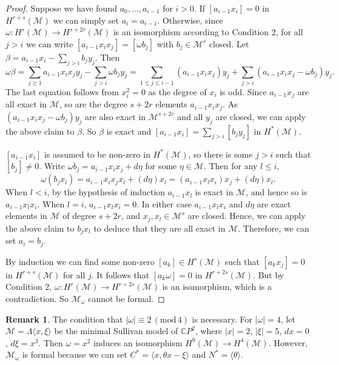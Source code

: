 \documentclass{article}
\theoremstyle{plain}
\theoremstyle{definition}
\newtheorem{rmk}[thm]{Remark}
\theoremstyle{plain}
\numberwithin{equation}{section}
\begin{document}
\begin{proof}
Suppose we have found $a_0,\ldots,a_{i-1}$ for $i>0$. If $[a_{i-1}x_i]=0$ in $H^{r+s}(\mathcal{M})$ we can simply set $a_i=a_{i-1}$. Otherwise, since $\omega:H^s(\mathcal{M})\to H^{s+2r}(\mathcal{M})$ is an isomorphism according to Condition 2, for all $j>i$ we can write $[a_{i-1}x_ix_j]=[\omega b_j]$ with $b_j\in\mathcal{M}^s$ closed. Let $\beta=a_{i-1}x_i-\sum_{j>i}b_j y_j$. Then
$$
\omega\beta = \sum_{j\geq 1} a_{i-1}x_ix_jy_j-\sum_{j>i}\omega b_j y_j = \sum_{1\leq j\leq i-1} (a_{i-1}x_ix_j)y_j+\sum_{j>i} (a_{i-1}x_ix_j-\omega b_j)y_j.
$$
The last equation follows from $x_i^2=0$ as the degree of $x_i$ is odd. Since $a_{i-1}x_j$ are all exact in $\mathcal{M}$, so are the degree $s+2r$ elements $a_{i-1}x_ix_j$. As $(a_{i-1}x_ix_j-\omega b_j)y_j$ are also exact in $\mathcal{M}^{s+2r}$ and all $y_j$ are closed, we can apply the above claim to $\beta$. So $\beta$ is exact and $[a_{i-1}x_i]=\sum_{j>i}[b_j y_j]$ in $H^*(\mathcal{M})$.

$[a_{i-1}x_i]$ is assumed to be non-zero in $H^*(\mathcal{M})$, so there is some $j>i$ such that $[b_j]\neq 0$. Write $\omega b_j=a_{i-1}x_ix_j+d\eta$ for some $\eta\in\mathcal{M}$. Then for any $l\leq i$,
$$
\omega(b_jx_l) = a_{i-1}x_ix_jx_l+(d\eta)x_l=(a_{i-1}x_lx_i)x_j+(d\eta)x_l.
$$
When $l<i$, by the hypothesis of induction $a_{i-1}x_l$ is exact in $\mathcal{M}$, and hence so is $a_{i-1}x_lx_i$. When $l=i$, $a_{i-1}x_lx_i=0$. In either case $a_{i-1}x_lx_i$ and $d\eta$ are exact elements in $\mathcal{M}$ of degree $s+2r$, and $x_j,x_l\in\mathcal{M}^s$ are closed. Hence, we can apply the above claim to $b_jx_l$ to deduce that they are all exact in $\mathcal{M}$. Therefore, we can set $a_i=b_j$.

By induction we can find some non-zero $[a_k]\in H^s(\mathcal{M})$ such that $[a_kx_j]=0$ in $H^{r+s}(\mathcal{M})$ for all $j$. It follows that $[a_k\omega]=0$ in $H^{r+2s}(\mathcal{M})$. But by Condition 2, $\omega: H^r(\mathcal{M}) \to H^{r+2s}(\mathcal{M})$ is an isomorphism, which is a contradiction. So $\mathcal{M}_{\omega}$ cannot be formal.
\end{proof}

\begin{rmk}
The condition that $|\omega|\equiv 2 \,(\mathrm{mod}\,4)$ is necessary. For $|\omega|=4$, let $\mathcal{M}=\Lambda\langle x,\xi \rangle$ be the minimal Sullivan model of $\mathbb{C}P^2$, where $|x|=2$, $|\xi|=5$, $dx=0$, $d\xi=x^3$. Then $\omega=x^2$ induces an isomorphism $H^0(\mathcal{M})\to H^4(\mathcal{M})$. However, $\mathcal{M}_{\omega}$ is formal because we can set $C^*=\langle x,\theta x-\xi \rangle$ and $N^*=\langle \theta \rangle$.
\end{rmk}
\end{document}
